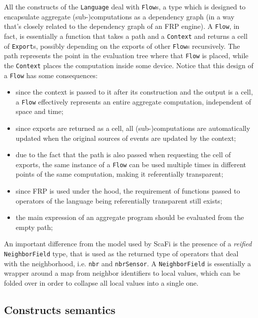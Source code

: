 All the constructs of the \texttt{Language} deal with \texttt{Flow}s, a type which is designed to encapsulate aggregate (sub-)computations as a dependency graph (in a way that's closely related to the dependency graph of an FRP engine).
%
A \texttt{Flow}, in fact, is essentially a function that takes a path and a \texttt{Context} and returns a cell of \texttt{Export}s, possibly depending on the exports of other \texttt{Flow}s recursively.
%
The path represents the point in the evaluation tree where that \texttt{Flow} is placed, while the \texttt{Context} places the computation inside some device.
%
Notice that this design of a \texttt{Flow} has some consequences:
%
\begin{itemize}
    \item since the context is passed to it after its construction and the output is a cell, a \texttt{Flow} effectively represents an entire aggregate computation, independent of space and time;
    \item since exports are returned as a cell, all (sub-)computations are automatically updated when the original sources of events are updated by the context;
    \item due to the fact that the path is also passed when requesting the cell of exports, the same instance of a \texttt{Flow} can be used multiple times in different points of the same computation, making it referentially transparent;
    \item since FRP is used under the hood, the requirement of functions passed to operators of the language being referentially transparent still exists;
    \item the main expression of an aggregate program should be evaluated from the empty path;
\end{itemize}

An important difference from the model used by ScaFi is the presence of a \textit{reified} \texttt{NeighborField} type, that is used as the returned type of operators that deal with the neighborhood, i.e. \texttt{nbr} and \texttt{nbrSensor}.
%
A \texttt{NeighborField} is essentially a wrapper around a map from neighbor identifiers to local values, which can be folded over in order to collapse all local values into a single one.

\subsection{Constructs semantics}
\label{sec:constructs-semantics}


